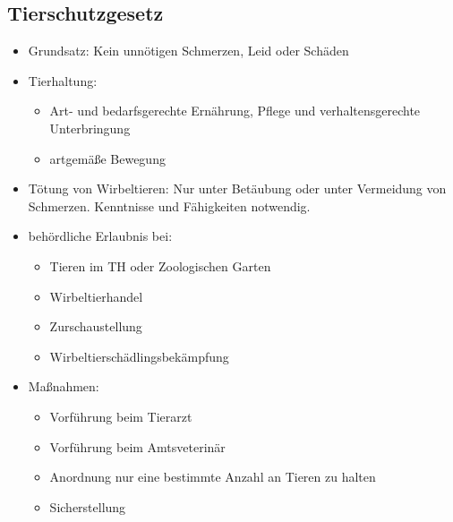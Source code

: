     \subsection{Tierschutzgesetz}
        \begin{itemize}
            \item Grundsatz: Kein unnötigen Schmerzen, Leid oder Schäden
            \item Tierhaltung:
            \begin{itemize}
                \item Art- und bedarfsgerechte Ernährung, Pflege und verhaltensgerechte Unterbringung
                \item artgemäße Bewegung
            \end{itemize}
            \item Tötung von Wirbeltieren: Nur unter Betäubung oder unter Vermeidung von Schmerzen. Kenntnisse und Fähigkeiten notwendig.
            \item behördliche Erlaubnis bei:
            \begin{itemize}
                \item Tieren im TH oder Zoologischen Garten
                \item Wirbeltierhandel
                \item Zurschaustellung
                \item Wirbeltierschädlingsbekämpfung
            \end{itemize}

            \clearpage
            \item Maßnahmen:
            \begin{itemize}
                \item Vorführung beim Tierarzt
                \item Vorführung beim Amtsveterinär
                \item Anordnung nur eine bestimmte Anzahl an Tieren zu halten
                \item Sicherstellung
            \end{itemize}
        \end{itemize}

